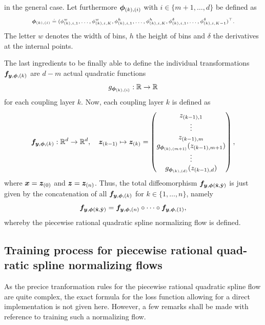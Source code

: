 \documentclass[a4paper,12pt]{report}
\begin{document}
in the general case. Let furthermore $\bm{\phi}_{(k),(i)}$ with $i \in \{m+1,\dots,d\}$ be defined as \begin{align}\scriptsize\begin{aligned}
\bm{\phi}_{(k),(i)} \doteq (\phi_{(k),i,1}^w,\dots,\phi_{(k),i,K}^w, \phi_{(k),i,1}^h, \dots, \phi_{(k),i,K}^h, \phi_{(k),i,1}^\delta, \dots,\phi_{(k),i,K-1}^\delta)^\top.
\end{aligned}\end{align} The letter $w$ denotes the width of bins, $h$ the height of bins and $\delta$ the derivatives at the internal points.

The last ingredients to be finally able to define the individual transformations $\bm{f}_{\bm{y},\bm{\phi},(k)}$ are $d-m$ actual quadratic functions \begin{equation}
g_{\bm{\phi}_{(k),(i)}} : \mathbb{R} \rightarrow \mathbb{R}
\end{equation} for each coupling layer $k$. Now, each coupling layer $k$ is defined as \begin{equation}
\bm{f}_{\bm{y},\bm{\phi},(k)} : \mathbb{R}^d \rightarrow \mathbb{R}^d, \quad \bm{z}_{(k-1)} \mapsto \bm{z}_{(k)} = \begin{pmatrix}
z_{(k-1),1} \\
\vdots \\
z_{(k-1),m} \\
g_{\bm{\phi}_{(k),(m+1)}}(z_{(k-1),m+1}) \\
\vdots \\
g_{\bm{\phi}_{(k),(d)}}(z_{(k-1),d})
\end{pmatrix},
\end{equation} where $\bm{x} = \bm{z}_{(0)}$ and $\bm{z} = \bm{z}_{(n)}$. Thus, the total diffeomorphism $\bm{f}_{\bm{y},\bm{\phi}(\hat{\boldsymbol{\mathbf{x}}},\hat{\boldsymbol{\mathbf{y}}})}$ is just given by the concatenation of all $\bm{f}_{\bm{y},\bm{\phi},(k)}$ for $k \in \{1,\dots,n\}$, namely \begin{equation}
\bm{f}_{\bm{y},\bm{\phi}(\hat{\boldsymbol{\mathbf{x}}},\hat{\boldsymbol{\mathbf{y}}})} = \bm{f}_{\bm{y},\bm{\phi},(n)} \circ \dots \circ \bm{f}_{\bm{y},\bm{\phi},(1)},
\end{equation} whereby the piecewise rational quadratic spline normalizing flow is defined.

\subsection{Training process for piecewise rational quad-ratic spline normalizing flows}
As the precice tranformation rules for the piecewise rational quadratic spline flow are quite complex, the exact formula for the loss function allowing for a direct implementation is not given here. However, a few remarks shall be made with reference to training such a normalizing flow.
\end{document}
